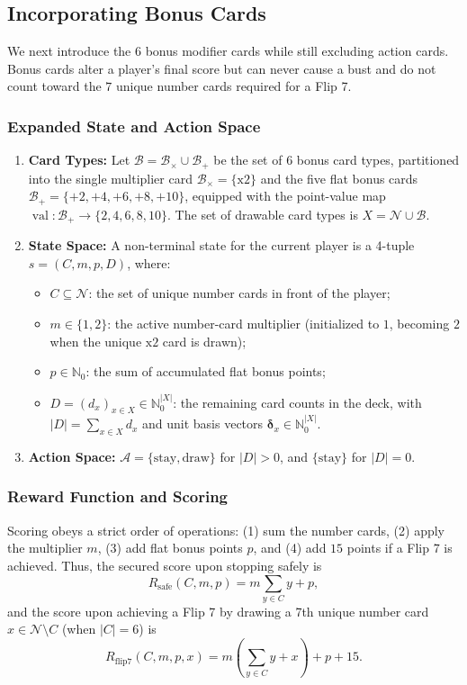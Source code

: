 \documentclass{article}
\theoremstyle{plain}
\theoremstyle{definition}
\theoremstyle{remark}
\DeclareMathOperator{\val}{val}
\begin{document}
\subsection{Incorporating Bonus Cards}
We next introduce the $6$ bonus modifier cards while still excluding action cards. Bonus cards alter a player's final score but can never cause a bust and do not count toward the $7$ unique number cards required for a Flip 7.

\subsubsection{Expanded State and Action Space}
\begin{enumerate}
    \item \textbf{Card Types:} Let $\mathcal{B} = \mathcal{B}_{\times} \cup \mathcal{B}_{+}$ be the set of $6$ bonus card types, partitioned into the single multiplier card $\mathcal{B}_{\times} = \{\text{x2}\}$ and the five flat bonus cards $\mathcal{B}_{+} = \{\text{+2}, \text{+4}, \text{+6}, \text{+8}, \text{+10}\}$, equipped with the point-value map $\val: \mathcal{B}_{+} \to \{2, 4, 6, 8, 10\}$. The set of drawable card types is $X = \mathcal{N} \cup \mathcal{B}$.

    \item \textbf{State Space:} A non-terminal state for the current player is a 4-tuple $s = (C, m, p, D)$, where:
    \begin{itemize}
        \item $C \subseteq \mathcal{N}$: the set of unique number cards in front of the player;
        \item $m \in \{1, 2\}$: the active number-card multiplier (initialized to $1$, becoming $2$ when the unique $\text{x2}$ card is drawn);
        \item $p \in \mathbb{N}_0$: the sum of accumulated flat bonus points;
        \item $D = (d_x)_{x \in X} \in \mathbb{N}_0^{|X|}$: the remaining card counts in the deck, with $|D| = \sum_{x \in X} d_x$ and unit basis vectors $\boldsymbol{\delta}_x \in \mathbb{N}_0^{|X|}$.
    \end{itemize}

    \item \textbf{Action Space:} $\mathcal{A} = \{\text{stay}, \text{draw}\}$ for $|D| > 0$, and $\{\text{stay}\}$ for $|D| = 0$.
\end{enumerate}

\subsubsection{Reward Function and Scoring}
Scoring obeys a strict order of operations: (1) sum the number cards, (2) apply the multiplier $m$, (3) add flat bonus points $p$, and (4) add $15$ points if a Flip 7 is achieved. Thus, the secured score upon stopping safely is
\[
    R_{\text{safe}}(C, m, p) = m \sum_{y \in C} y + p,
\]
and the score upon achieving a Flip 7 by drawing a 7th unique number card $x \in \mathcal{N} \setminus C$ (when $|C| = 6$) is
\[
    R_{\text{flip7}}(C, m, p, x) = m \left( \sum_{y \in C} y + x \right) + p + 15.
\]
\end{document}
